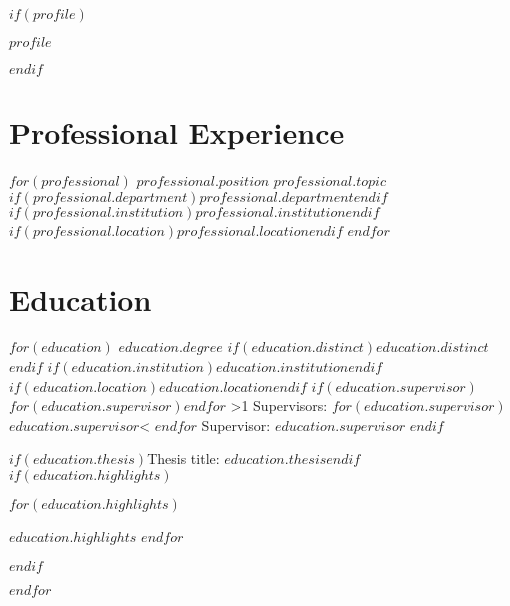 \documentclass[10pt]{deedy-resume-openfont}
\newcounter{counterA}
\newcounter{counterB}
\begin{document}
\lastupdated

$if(profile)$
\begin{minipage}[t]{\textwidth}
$profile$
\end{minipage}
\sectionsep
$endif$

\section{Professional Experience}
$for(professional)$
%
{$professional.position$}%
{$professional.topic$}%
{$if(professional.department)$$professional.department$$endif$}%
{$if(professional.institution)$\emph{$professional.institution$}$endif$}%
{$if(professional.location)$$professional.location$$endif$}%
{}%
$endfor$
\sectionsep
\section{Education}
$for(education)$
%
{$education.degree$}%
{$if(education.distinct)$$education.distinct$$endif$}%
{$if(education.institution)$\emph{$education.institution$}$endif$}%
{$if(education.location)$$education.location$$endif$}%
{$if(education.supervisor)$%
\setcounter{counterA}{0}%
\setcounter{counterB}{0}%
\def\variable{0}
$for(education.supervisor)$$endfor$%
\ifnum\value{counterA}>1%
Supervisors: 
$for(education.supervisor)$%
%
$education.supervisor$\ifnum\value{counterB}<\value{counterA}\customsep\fi%
$endfor$%
\else%
Supervisor: $education.supervisor$%
\fi%
$endif$%
}%
{$if(education.thesis)$Thesis title: \textbf{$education.thesis$}$endif$
$if(education.highlights)$%
{\small%
\begin{tightemize}%
$for(education.highlights)$
\item $education.highlights$%
$endfor$
\end{tightemize}}%
$endif$%
}%
$endfor$
\sectionsep
\end{document}
